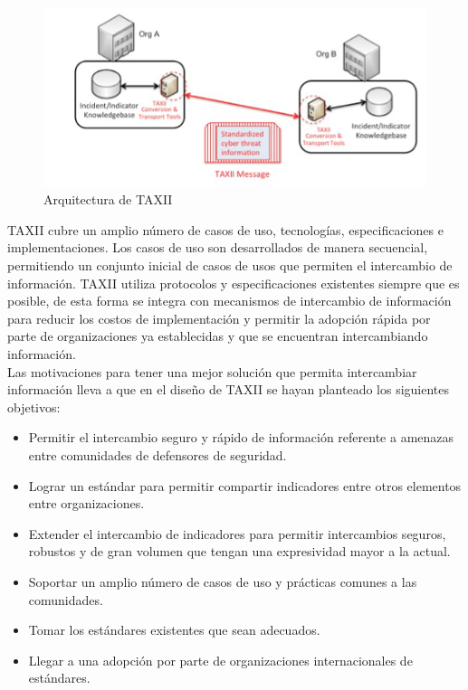  
\begin{figure}[ht!]
  \centering
    \includegraphics[width=150mm]{./images/TAXIIArchitecture1.png}
    \caption{Arquitectura de TAXII \protect\cite{b1}}
\end{figure}


TAXII cubre un amplio número de casos de uso, tecnologías, especificaciones e 
implementaciones. Los casos de uso son desarrollados de manera secuencial, 
permitiendo un conjunto inicial de casos de usos que permiten el intercambio de 
información. TAXII utiliza protocolos y especificaciones existentes siempre que 
es posible, de esta forma se integra con mecanismos de intercambio de 
información para reducir los costos de implementación y permitir la adopción 
rápida por parte de organizaciones ya establecidas y que se encuentran 
intercambiando información.\\

Las motivaciones para tener una mejor solución que permita intercambiar 
información lleva a que en el diseño de TAXII se hayan planteado los siguientes 
objetivos:
 \begin{itemize}
   \item Permitir el intercambio seguro y rápido de información referente a 
   amenazas entre comunidades de defensores de seguridad.
   \item Lograr un estándar para permitir compartir indicadores entre otros 
   elementos entre organizaciones.
   \item Extender el intercambio de indicadores para permitir intercambios 
   seguros, robustos y de gran volumen que tengan una expresividad mayor a la 
   actual.
   \item Soportar un amplio número de casos de uso y prácticas comunes a las 
   comunidades.
   \item Tomar los estándares existentes que sean adecuados.
   \item Llegar a una adopción por parte de organizaciones internacionales de 
   estándares.
 \end{itemize}

